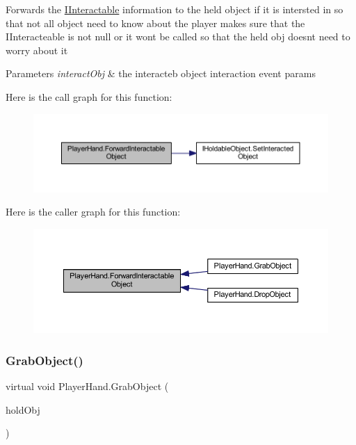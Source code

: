 Forwards the \mbox{\hyperlink{interface_i_interactable}{I\+Interactable}} information to the held object if it is intersted in so that not all object need to know about the player makes sure that the I\+Interacteable is not null or it wont be called so that the held obj doesn\textquotesingle{}t need to worry about it 


\begin{DoxyParams}{Parameters}
{\em interact\+Obj} & the interacteb object interaction event params\\
\hline
\end{DoxyParams}
Here is the call graph for this function\+:
\nopagebreak
\begin{figure}[H]
\begin{center}
\leavevmode
\includegraphics[width=350pt]{class_player_hand_a67095e4c1db1e3369c435dd1fe1ebec5_cgraph}
\end{center}
\end{figure}
Here is the caller graph for this function\+:\nopagebreak
\begin{figure}[H]
\begin{center}
\leavevmode
\includegraphics[width=350pt]{class_player_hand_a67095e4c1db1e3369c435dd1fe1ebec5_icgraph}
\end{center}
\end{figure}
\mbox{\label{class_player_hand_a64a86af904a77f4a0b92d72bd5fdf43c}} 
\subsubsection{\texorpdfstring{Grab\+Object()}{GrabObject()}}
{\footnotesize\ttfamily virtual void Player\+Hand.\+Grab\+Object (\begin{DoxyParamCaption}\item[{\mbox{\hyperlink{interface_i_holdable_object}{I\+Holdable\+Object}}}]{hold\+Obj }\end{DoxyParamCaption})\hspace{0.3cm}{\ttfamily [virtual]}}



